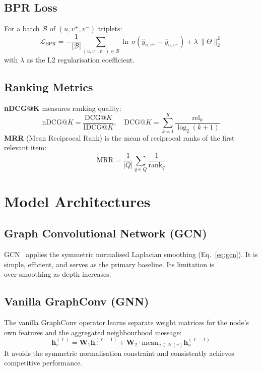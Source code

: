 \documentclass[conference]{IEEEtran}
\begin{document}
\subsection{BPR Loss}
For a batch $\mathcal{B}$ of $(u,v^+,v^-)$ triplets:
\begin{equation}
\mathcal{L}_{\text{BPR}} = -\frac{1}{|\mathcal{B}|}\sum_{(u,v^+,v^-)\in\mathcal{B}} \ln\,\sigma\!\left(\hat{y}_{u,v^+}-\hat{y}_{u,v^-}\right) + \lambda\,\|\Theta\|_2^2
\label{eq:bpr}
\end{equation}
with $\lambda$ as the L2 regularisation coefficient.

\subsection{Ranking Metrics}
\textbf{nDCG@K} measures ranking quality:
\begin{equation}
\text{nDCG@}K = \frac{\text{DCG@}K}{\text{IDCG@}K},\quad \text{DCG@}K = \sum_{k=1}^{K}\frac{\text{rel}_k}{\log_2(k+1)}
\end{equation}
\textbf{MRR} (Mean Reciprocal Rank) is the mean of reciprocal ranks of the first relevant item:
\begin{equation}
\text{MRR}=\frac{1}{|Q|}\sum_{q\in Q}\frac{1}{\text{rank}_q}
\end{equation}

\section{Model Architectures}\label{sec:architectures}
\subsection{Graph Convolutional Network (GCN)}
GCN~\cite{kipf2017} applies the symmetric normalised Laplacian smoothing (Eq.~\ref{eq:gcn}). It is simple, efficient, and serves as the primary baseline. Its limitation is over‑smoothing as depth increases.

\subsection{Vanilla GraphConv (GNN)}
The vanilla GraphConv operator learns separate weight matrices for the node's own features and the aggregated neighbourhood message:
\begin{equation}
\mathbf{h}_v^{(\ell)} = \mathbf{W}_1\mathbf{h}_v^{(\ell-1)} + \mathbf{W}_2 \cdot \text{mean}_{u\in\mathcal{N}(v)} \mathbf{h}_u^{(\ell-1)}
\end{equation}
It avoids the symmetric normalisation constraint and consistently achieves competitive performance.
\end{document}
